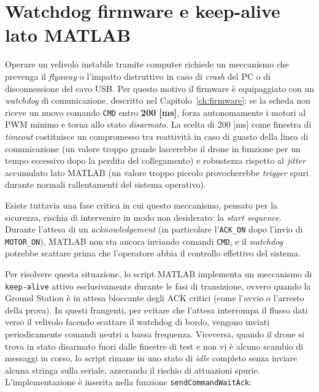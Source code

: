 \documentclass[11pt]{report}
\begin{document}
	\section{Watchdog firmware e keep-alive lato MATLAB}
	\label{sec:watchdog_keepalive}
	
	Operare un velivolo instabile tramite computer richiede un meccanismo che prevenga il \textit{flyaway} o l'impatto distruttivo in caso di \textit{crash} del PC o di disconnessione del cavo USB. Per questo motivo il firmware è equipaggiato con un \textit{watchdog} di comunicazione, descritto nel Capitolo~\ref{ch:firmware}: se la scheda non riceve un nuovo comando \texttt{CMD} entro \textbf{200 [ms]}, forza autonomamente i motori al PWM minimo e torna allo stato \textit{disarmato}. La scelta di 200 [ms] come finestra di \textit{timeout} costituisce un compromesso tra reattività in caso di guasto della linea di comunicazione (un valore troppo grande lascerebbe il drone in funzione per un tempo eccessivo dopo la perdita del collegamento) e robustezza rispetto al \textit{jitter} accumulato lato MATLAB (un valore troppo piccolo provocherebbe \textit{trigger} spuri durante normali rallentamenti del sistema operativo).
	
	Esiste tuttavia una fase critica in cui questo meccanismo, pensato per la sicurezza, rischia di intervenire in modo non desiderato: la \textit{start sequence}. Durante l'attesa di un \textit{acknowledgement} (in particolare l'\texttt{ACK\_ON} dopo l'invio di \texttt{MOTOR\_ON}), MATLAB non sta ancora inviando comandi \texttt{CMD}, e il \textit{watchdog} potrebbe scattare prima che l'operatore abbia il controllo effettivo del sistema.
	
	Per risolvere questa situazione, lo script MATLAB implementa un meccanismo di \texttt{keep-alive} attivo esclusivamente durante le fasi di transizione, ovvero quando la Ground Station è in attesa bloccante degli ACK critici (come l'avvio o l'arresto della prova). In questi frangenti, per evitare che l'attesa interrompa il flusso dati verso il velivolo facendo scattare il watchdog di bordo, vengono inviati periodicamente comandi neutri a bassa frequenza. Viceversa, quando il drone si trova in stato disarmato fuori dalle finestre di test e non vi è alcuno scambio di messaggi in corso, lo script rimane in uno stato di \textit{idle} completo senza inviare alcuna stringa sulla seriale, azzerando il rischio di attuazioni spurie. L'implementazione è inserita nella funzione \texttt{sendCommandWaitAck}:
	
\end{document}
